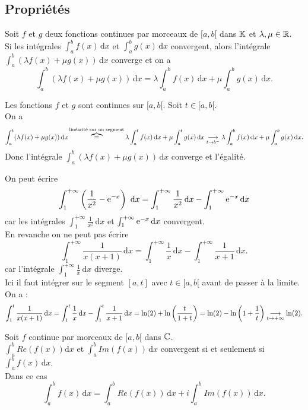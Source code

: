 \documentclass{book}
\begin{document}
\subsection{Propriétés}
\begin{Proposition}[Linéarité]
Soit $f$ et $g$ deux fonctions continues par morceaux de $[a,b[$ dans $\mathbb{K}$ et $\lambda,\mu\in\mathbb{R}$.\\
 Si les intégrales $\int_a^b f(x)\,\mathrm dx$ et $\int_a^b g(x)\,\mathrm dx$ convergent, alors l'intégrale $\int_a^b (\lambda f(x) +\mu g(x))\,\mathrm dx$ converge et on a
 $$\int_a^b (\lambda f(x) +\mu g(x))\,\mathrm dx=\lambda \int_a^b f(x)\,\mathrm dx +\mu \int_a^b g(x)\,\mathrm dx.$$
\end{Proposition}
\begin{Demonstration}
Les fonctions $f$ et $g$ sont continues sur $[a,b[$. Soit $t\in [a,b[$.\\
On a $$\int_a^t (\lambda f(x) +\mu g(x))\,\mathrm dx\overbrace{=}^{\text{linéarité sur un segment}}\lambda \int_a^t f(x)\,\mathrm dx +\mu \int_a^t g(x)\,\mathrm dx\tend[t\to b^-]\lambda \int_a^b f(x)\,\mathrm dx +\mu \int_a^b g(x)\,\mathrm dx.$$
Donc l'intégrale $\int_a^b (\lambda f(x) +\mu g(x))\,\mathrm dx$ converge et l'égalité.
\end{Demonstration}
\begin{Exemple}
On peut écrire
$$ \int _{1}^{+\infty }\left({\frac {1}{x^{2}}}-{\rm {e}}^{-x}\right)\,\,\mathrm {d} x=\int _{1}^{+\infty }{\frac {1}{x^{2}}}\,\mathrm {d} x-\int _{1}^{+\infty }{\rm {e}}^{-x}\,\mathrm {d} x$$
car les intégrales $\int _{1}^{+\infty }{\frac {1}{x^{2}}}\,\mathrm {d} x $ et  $\int _{1}^{+\infty }{\rm {e}}^{-x}\,\mathrm {d} x$  convergent.\\
En revanche on ne peut pas écrire
$$ \int _{1}^{+\infty }{\frac {1}{x(x+1)}}\,\mathrm {d} x=\int _{1}^{+\infty }\frac {1}{x}\,\mathrm {d} x-\int _{1}^{+\infty }\frac {1}{x+1}\,\mathrm {d} x.$$
car l'intégrale $\int _{1}^{+\infty }\frac {1}{x}\,\mathrm {d} x$ diverge. \\
Ici il faut intégrer sur le segment $[a, t ]$ avec $t\in [a,b [$ avant de passer à la limite. On a :
$$ \int _{1}^{t }{\frac {1}{x(x+1)}}\,\mathrm {d} x=\int _{1}^{t }\frac {1}{x}\,\mathrm {d} x-\int _{1}^{t }\frac {1}{x+1}\,\mathrm {d} x=\ln(2)+\ln\left(\frac{t}{1+t}\right)=\ln(2)-\ln\left(1+\frac 1 t\right)\tend[t\to +\infty]\ln(2).$$
\end{Exemple}
\begin{Corollaire}
Soit $f$  continue par morceaux de $[a,b[$ dans $\mathbb{C}$.\\
$\int_a^b Re(f(x))\mathrm dx$  et $\int_a^b Im(f(x))\,\mathrm dx$ convergent si et seulement si $\int_a^b f(x)\,\mathrm dx$.\\
Dans ce cas 
$$ \int_a^b f(x)\,\mathrm dx = \int_a^b Re(f(x))\,\mathrm dx+ i \int_a^b Im(f(x))\,\mathrm dx.$$
\end{Corollaire}
\end{document}
